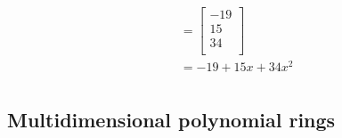 \begin{align*}
{  }                                                                           \\
                 & = \begin{bmatrix}
                       -19 \\
                       15  \\
                       34  \\
                     \end{bmatrix}                                           \\
                 & = -19+15x+34x^2                                             \\                     
\end{align*}


\subsection*{Multidimensional polynomial rings}


